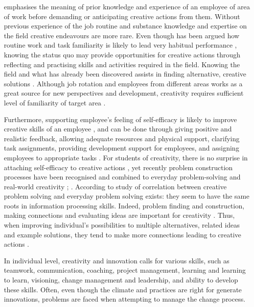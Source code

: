 \citet{shalley2004leaders} emphasises the meaning of prior knowledge and experience of an employee of area of work before demanding or anticipating creative actions from them. Without previous experience of the job routine and substance knowledge and expertise on the field creative endeavours are more rare. Even though has been argued how routine work and task familiarity is likely to lead very habitual performance \citep{ford1996theory}, knowing the status quo may provide opportunities for creative actions through reflecting and practising skills and activities required in the field. \citep{shalley2004leaders} Knowing the field and what has already been discovered assists in finding alternative, creative solutions \citep{andriopoulos2000enhancing}. Although job rotation and employees from different areas works as a great source for new perspectives and development, creativity requires sufficient level of familiarity of target area \citep{shalley2004leaders}.

Furthermore, supporting employee's feeling of self-efficacy is likely to improve creative skills of an employee \citep{redmond1993putting}, and can be done through giving positive and realistic feedback, allowing adequate resources and physical support, clarifying task assignments, providing development support for employees, and assigning employees to appropriate tasks \citep{hennessey19881}. For students of creativity, there is no surprise in attaching self-efficacy to creative actions \citep{mumford1988creativity}, yet recently problem construction processes have been recognised and combined to everyday problem-solving and real-world creativity \citep{getzels1975problem}; \citep{runco1988problem}. According to study of  \citep{gardner1988creativity} correlation between creative problem solving and everyday problem solving exists: they seem to have the same roots in information processing skills.  Indeed, problem finding and construction, making connections and evaluating ideas are important for creativity \citep{mumford2002leading,vincent2002divergent}. Thus, when improving individual's possibilities to multiple alternatives, related ideas and example solutions, they tend to make more connections leading to creative actions \citep{amabile1996assessing}. 

In individual level, creativity and innovation calls for various skills, such as teamwork, communication, coaching, project management, learning and learning to learn, visioning, change management and leadership, and ability to develop these skills. Often, even though the climate and practices are right for generate innovations, problems are faced when attempting to manage the change process. \citep{roffe1999innovation}

